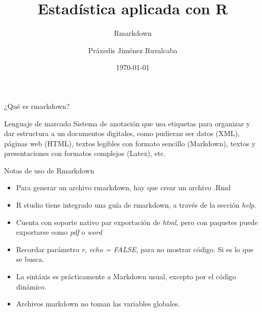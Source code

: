 \documentclass[aspectratio=169,xcolor=dvipsnames]{beamer}
\title{Estadística aplicada con R}
\subtitle{Rmarkdown}
\author{Práxedis Jiménez Ruvalcaba}
\institute
{

}
\date{\today}
\begin{document}
\begin{frame}[c]

    \vspace{1cm}
    \begin{center}
        \insertauthor\par
        \vspace{0.5cm}
        \insertinstitute\par
        \insertdate
    \end{center}
    
\end{frame}

\begin{frame}{¿Qué es rmarkdown?}
    \begin{block}{Lenguaje de marcado}
        Sistema de anotación que usa etiquetas para organizar y dar estructura a un documentos digitales, como pudieran
        ser datos (XML), páginas web (HTML), textos legibles con formato sencillo (Markdown), textos y presentaciones 
        con formatos complejos (Latex), etc.
    \end{block}
\end{frame}

\begin{frame}{Notas de uso de Rmarkdown}
    \begin{itemize}
        \item Para generar un archivo rmarkdown, hay que crear un archivo .Rmd
        \item R studio tiene integrado una guía de rmarkdown, a través de la sección \textit{help}.
        \item Cuenta con soporte nativo par exportación de \textit{html}, pero con paquetes puede exportarse como \textit{pdf} o \textit{word}
        \item Recordar parámetro \textit{r, echo = FALSE}, para no mostrar código. Si es lo que se busca.
        \item La sintáxis es prácticamente a Markdown usual, excepto por el código dinámico.
        \item Archivos markdown no toman las variables globales. 
    \end{itemize}
\end{frame}
\end{document}
